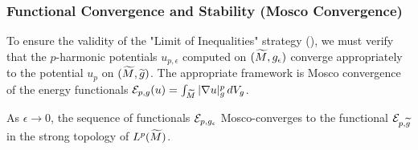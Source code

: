 \subsubsection{Functional Convergence and Stability (Mosco Convergence)}
\label{sec:Mosco}

To ensure the validity of the "Limit of Inequalities" strategy (), we must verify that the $p$-harmonic potentials $u_{p,\epsilon}$ computed on $(\widetilde{M}, g_{\epsilon})$ converge appropriately to the potential $u_p$ on $(\widetilde{M}, \widetilde{g})$. The appropriate framework is Mosco convergence of the energy functionals $\mathcal{E}_{p,g}(u) = \int_{\widetilde{M}} |\nabla u|_g^p \, dV_g$.

\begin{theorem}\label{thm:MoscoConvergenceSmoothing}
As $\epsilon \to 0$, the sequence of functionals $\mathcal{E}_{p,g_{\epsilon}}$ Mosco-converges to the functional $\mathcal{E}_{p,\widetilde{g}}$ in the strong topology of $L^p(\widetilde{M})$.
\end{theorem}
